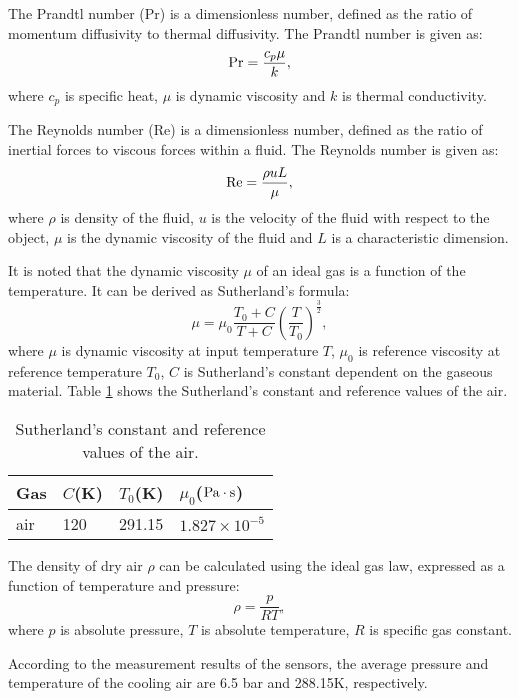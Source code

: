 \documentclass{article}
\begin{document}
The Prandtl number (Pr) is a dimensionless number, defined as the ratio of momentum diffusivity to thermal diffusivity.
The Prandtl number is given as:
\[{\rm{Pr}} = \frac{{{c_p}\mu }}{k},\]
where
$c_{p}$ is specific heat, $\mu$ is dynamic viscosity and $k$ is thermal conductivity.

The Reynolds number (Re) is a dimensionless number, defined as the ratio of inertial forces to viscous forces within a fluid.
The Reynolds number is given as:
\[{\rm{Re}} = \frac{{\rho uL}}{\mu },\]
where
$\rho$ is density of the fluid, $u$ is the velocity of the fluid with respect to the object, $\mu$ is the dynamic viscosity of the fluid and $L$ is a characteristic dimension.

It is noted that the dynamic viscosity $\mu$ of an ideal gas is a function of the temperature. It can be derived as Sutherland's formula:
\[\mu  = {\mu _0}\frac{{{T_0} + C}}{{T + C}}{\left( {\frac{T}{{{T_0}}}} \right)^{\frac{3}{2}}},\]
where $\mu$ is dynamic viscosity at input temperature $T$,
$\mu_0$ is reference viscosity at reference temperature $T_0$,
$C$ is Sutherland's constant dependent on the gaseous material.
Table \ref{tab:SutherlandConstant} shows the Sutherland's constant and reference values of the air.
\begin{table}[htbp]
  \centering
  \caption{Sutherland's constant and reference values of the air.}
    \begin{tabular}{p{2cm}p{2cm}p{2cm}p{3cm}}
    \toprule
    Gas   & $C$(K) & $T_0$(K) & $\mu_0$($\rm{Pa\cdot s}$) \\
    \midrule
    air   & 120   & 291.15 & $1.827\times 10^{-5}$ \\
    \bottomrule
    \end{tabular}%
  \label{tab:SutherlandConstant}%
\end{table}%

The density of dry air $\rho$ can be calculated using the ideal gas law, expressed as a function of temperature and pressure:
\begin{equation}
\rho  = \frac{p}{{RT}},
\label{Equ:AirDensity}
\end{equation}
where
$p$ is absolute pressure,
$T$ is absolute temperature,
$R$ is specific gas constant.

According to the measurement results of the sensors, the average pressure and temperature of the cooling air are 6.5 bar and 288.15K, respectively.
\end{document}
